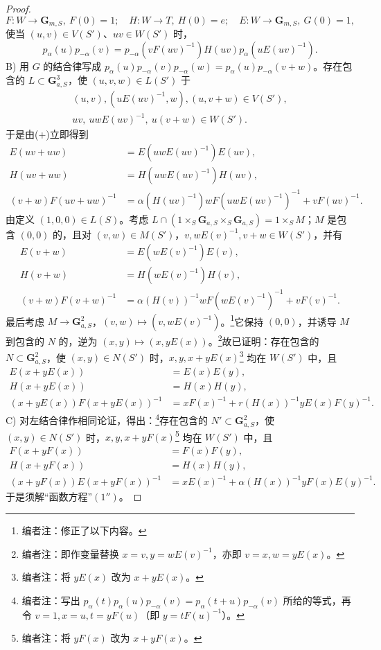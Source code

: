 \begin{proof}
\[F:W\to\mathbf G_{m,S},\ F(0)=1;\quad H:W\to T,\ H(0)=e;\quad E:W\to\mathbf G_{m,S},\ G(0)=1,\]
使当 $(u,v)\in V(S')$、$uv\in W(S')$ 时，
\[p_\alpha(u)p_{-\alpha}(v)=p_{-\alpha}(vF(uv)^{-1})H(uv)p_\alpha(uE(uv)^{-1}).\tag{+}\]
B) 用 $G$ 的结合律写成 $p_\alpha(u)p_{-\alpha}(v)p_{-\alpha}(w)=p_\alpha(u)p_{-\alpha}(v+w)$。存在包含的 $L\subset\mathbf G_{a,S}^3$，使 $(u,v,w)\in L(S')$ 于
\[\begin{gathered}(u,v),(uE(uv)^{-1},w),(u,v+w)\in V(S'),\\uv,\ uwE(uv)^{-1},\ u(v+w)\in W(S').\end{gathered}\]
于是由(+)立即得到
\begin{align*}E(uv+uw)&=E(uwE(uv)^{-1})E(uv),\tag{1}\\H(uv+uw)&=H(uwE(uv)^{-1})H(uv),\tag{2}\\(v+w)F(uv+uw)^{-1}&=\alpha(H(uv)^{-1})wF(uwE(uv)^{-1})^{-1}+vF(uv)^{-1}.\tag{3}\end{align*}
由定义 $(1,0,0)\in L(S)$。考虑 $L\cap(1\times_S\mathbf G_{a,S}\times_S\mathbf G_{a,S})=1\times_SM$；$M$ 是包含 $(0,0)$ 的，且对 $(v,w)\in M(S')$，$v,wE(v)^{-1},v+w\in W(S')$，并有
\begin{align*}E(v+w)&=E(wE(v)^{-1})E(v),\tag{$1'$}\\H(v+w)&=H(wE(v)^{-1})H(v),\tag{$2'$}\\(v+w)F(v+w)^{-1}&=\alpha(H(v))^{-1}wF(wE(v)^{-1})^{-1}+vF(v)^{-1}.\tag{$3'$}\end{align*}
最后考虑 $M\to\mathbf G_{a,S}^2$，$(v,w)\mapsto(v,wE(v)^{-1})$。\footnote{编者注：修正了以下内容。}它保持 $(0,0)$，并诱导 $M$ 到包含的 $N$ 的，逆为 $(x,y)\mapsto(x,yE(x))$。\footnote{编者注：即作变量替换 $x=v,y=wE(v)^{-1}$，亦即 $v=x,w=yE(x)$。}故已证明：存在包含的 $N\subset\mathbf G_{a,S}^2$，使 $(x,y)\in N(S')$ 时，$x,y,x+yE(x)$\footnote{编者注：将 $yE(x)$ 改为 $x+yE(x)$。} 均在 $W(S')$ 中，且
\begin{align*}E(x+yE(x))&=E(x)E(y),\tag{$1''$}\\H(x+yE(x))&=H(x)H(y),\tag{$2''$}\\(x+yE(x))F(x+yE(x))^{-1}&=xF(x)^{-1}+r(H(x))^{-1}yE(x)F(y)^{-1}.\tag{$3''$}\end{align*}
C) 对左结合律作相同论证，得出：\footnote{编者注：写出 $p_\alpha(t)p_\alpha(u)p_{-\alpha}(v)=p_\alpha(t+u)p_{-\alpha}(v)$ 所给的等式，再令 $v=1,x=u,t=yF(u)$（即 $y=tF(u)^{-1}$）。}存在包含的 $N'\subset\mathbf G_{a,S}^2$，使 $(x,y)\in N(S')$ 时，$x,y,x+yF(x)$\footnote{编者注：将 $yF(x)$ 改为 $x+yF(x)$。} 均在 $W(S')$ 中，且
\begin{align*}F(x+yF(x))&=F(x)F(y),\tag{$4''$}\\H(x+yF(x))&=H(x)H(y),\tag{$5''$}\\(x+yF(x))E(x+yF(x))^{-1}&=xE(x)^{-1}+\alpha(H(x))^{-1}yF(x)E(y)^{-1}.\tag{$6''$}\end{align*}
于是须解“函数方程”$(1'')$。
\end{proof}
